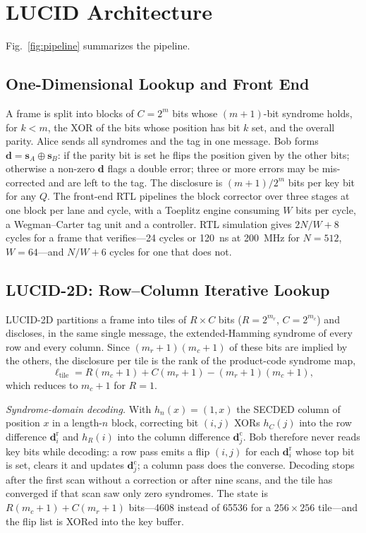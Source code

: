 \documentclass[conference]{IEEEtran}
\begin{document}
\section{LUCID Architecture}\label{sec:arch}
Fig.~\ref{fig:pipeline} summarizes the pipeline.

\subsection{One-Dimensional Lookup and Front End}
A frame is split into blocks of $C=2^{m}$ bits whose $(m+1)$-bit syndrome holds, for $k<m$, the XOR of the bits whose position has bit $k$ set, and the overall parity. Alice sends all syndromes and the tag in one message. Bob forms $\mathbf{d}=\mathbf{s}_A\oplus\mathbf{s}_B$: if the parity bit is set he flips the position given by the other bits; otherwise a non-zero $\mathbf{d}$ flags a double error; three or more errors may be mis-corrected and are left to the tag. The disclosure is $(m+1)/2^m$ bits per key bit for any $Q$. The front-end RTL pipelines the block corrector over three stages at one block per lane and cycle, with a Toeplitz engine consuming $W$ bits per cycle, a Wegman--Carter tag unit and a controller. RTL simulation gives $2N/W+8$ cycles for a frame that verifies---24 cycles or 120~ns at 200~MHz for $N=512$, $W=64$---and $N/W+6$ cycles for one that does not.

\subsection{LUCID-2D: Row--Column Iterative Lookup}
LUCID-2D partitions a frame into tiles of $R\times C$ bits ($R=2^{m_r}$, $C=2^{m_c}$) and discloses, in the same single message, the extended-Hamming syndrome of every row and every column. Since $(m_r+1)(m_c+1)$ of these bits are implied by the others, the disclosure per tile is the rank of the product-code syndrome map,
\begin{equation}
\ell_{\mathrm{tile}}=R(m_c+1)+C(m_r+1)-(m_r+1)(m_c+1),
\label{eq:leak2d}
\end{equation}
which reduces to $m_c+1$ for $R=1$.

\textit{Syndrome-domain decoding.} With $h_n(x)=(1,x)$ the SECDED column of position $x$ in a length-$n$ block, correcting bit $(i,j)$ XORs $h_C(j)$ into the row difference $\mathbf{d}^{\mathrm{r}}_i$ and $h_R(i)$ into the column difference $\mathbf{d}^{\mathrm{c}}_j$. Bob therefore never reads key bits while decoding: a row pass emits a flip $(i,j)$ for each $\mathbf{d}^{\mathrm{r}}_i$ whose top bit is set, clears it and updates $\mathbf{d}^{\mathrm{c}}_j$; a column pass does the converse. Decoding stops after the first scan without a correction or after nine scans, and the tile has converged if that scan saw only zero syndromes. The state is $R(m_c+1)+C(m_r+1)$ bits---4608 instead of 65536 for a $256\times256$ tile---and the flip list is XORed into the key buffer.
\end{document}
